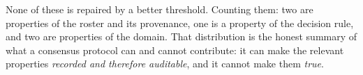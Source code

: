 None of these is repaired by a better threshold. Counting them: two are properties of the roster and
its provenance, one is a property of the decision rule, and two are properties of the domain. That
distribution is the honest summary of what a consensus protocol can and cannot contribute: it can
make the relevant properties \emph{recorded and therefore auditable}, and it cannot make them
\emph{true}.
